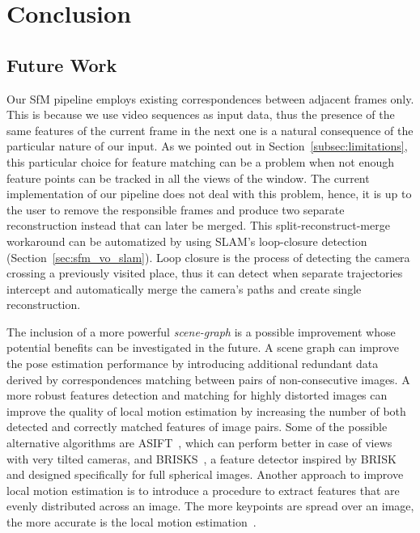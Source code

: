 \chapter{Conclusion}
%
\section{Future Work}\label{sec:future_work}
Our SfM pipeline employs existing correspondences between adjacent frames only.
This is because we use video sequences as input data, thus the presence of
the same features of the current frame in the next one is a natural consequence
of the particular nature of our input.
As we pointed out in Section~\ref{subsec:limitations}, this particular choice
for feature matching can be a problem when not enough feature points can be
tracked in all the views of the window.
The current implementation of our pipeline does not deal with this problem,
hence, it is up to the user to remove the responsible frames and produce two
separate reconstruction instead that can later be merged.
This split-reconstruct-merge workaround can be automatized by using SLAM's
loop-closure detection (Section~\ref{sec:sfm_vo_slam}).
Loop closure is the process of detecting the camera crossing a previously
visited place, thus it can detect when separate trajectories intercept
and automatically merge the camera's paths and create single reconstruction.

The inclusion of a more powerful \emph{scene-graph} is a possible improvement
whose potential benefits can be investigated in the future.
A scene graph can improve the pose estimation
performance by introducing additional redundant data derived by 
correspondences matching between pairs of non-consecutive images.
A more robust features detection and matching for highly distorted images
can improve the quality of local motion estimation by increasing the number
of both detected and correctly matched features of image pairs.
Some of the possible alternative algorithms are ASIFT~\cite{morel2009asift}, which
 can perform better in case of views with very tilted cameras, and
BRISKS~\cite{guan2017brisks}, a feature detector inspired by
BRISK~\cite{leutenegger2011brisk} and designed specifically for full spherical
images.
Another approach to improve local motion estimation is to
introduce a procedure to extract
features that are evenly distributed across an image. The more
keypoints are spread over an image, the more accurate is the local motion
estimation~\cite{irschara2009structure,schonberger2016structure}.

